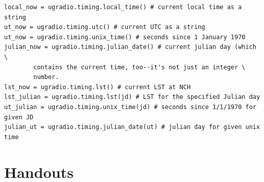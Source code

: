 \documentclass[11pt,preprint]{aastex}
\begin{document}
\begin{verbatim}
local_now = ugradio.timing.local_time() # current local time as a string
ut_now = ugradio.timing.utc() # current UTC as a string
ut_now = ugradio.timing.unix_time() # seconds since 1 January 1970
julian_now = ugradio.timing.julian_date() # current julian day (which \
        contains the current time, too--it's not just an integer \
        number. 
lst_now = ugradio.timing.lst() # current LST at NCH
lst_julian = ugradio.timing.lst(jd) # LST for the specified Julian day                       
ut_julian = ugradio.timing.unix_time(jd) # seconds since 1/1/1970 for given JD
julian_ut = ugradio.timing.julian_date(ut) # julian day for given unix time
\end{verbatim}

\section{Handouts} \label{handouts}
\end{document}
